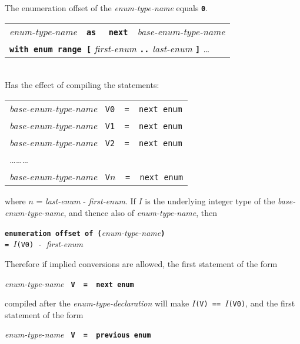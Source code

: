 \documentclass[12pt]{article}
\newcommand{\TT}[1]{{\tt \bfseries #1}}
\newcommand{\STAR}{{\Large $^\star$}}
\newenvironment{indpar}[1][0.3in]%
	{\begin{list}{}%
		     {\setlength{\itemsep}{0in}%
		      \setlength{\topsep}{0in}%
		      \setlength{\parsep}{1ex}%
		      \setlength{\labelwidth}{#1}%
		      \setlength{\leftmargin}{#1}%
		      \addtolength{\leftmargin}{\labelsep}}%
	 \item}%
	{\end{list}}
\newenvironment{itemlist}[1][0.5in]%
	{\begin{list}{}{\setlength{\labelwidth}{#1}%
	                \setlength{\leftmargin}{#1}%
		        \addtolength{\leftmargin}{\labelsep}}}%
	{\end{list}}
\begin{document}
\begin{indpar}
\begin{itemlist}
\item[\TT{define type} {\em qualifier-name}\STAR{} {\em enum-type-name}~~%
    \TT{as}~~{\em builtin-integer-type-name} \ldots{}] ~\\
The enumeration offset of the {\em enum-type-name} equals \TT{0}.
\item[\TT{define type} {\em qualifier-name}\STAR{}]
              \begin{tabular}[t]{@{}l@{}}
              {\em enum-type-name}~~\TT{as}~~%
              \TT{next}~~{\em base-enum-type-name} \\
	      \TT{with enum range [}
	         {\em first-enum} \TT{..} {\em last-enum} \TT{]} \ldots{} \\
	      \end{tabular} \\
Has the effect of compiling the statements:
\begin{center}
\begin{tabular}{l}
{\em base-enum-type-name} {\tt ~V0~~=~~next enum} \\
{\em base-enum-type-name} {\tt ~V1~~=~~next enum} \\
{\em base-enum-type-name} {\tt ~V2~~=~~next enum} \\
\ldots\ldots\ldots \\
{\em base-enum-type-name} {\tt ~V$n$~~=~~next enum} \\
\end{tabular}
\end{center}
where $n$ = {\em last-enum} - {\em first-enum}.
If $I$ is the underlying integer type of the {\em base-enum-type-name},
and thence also of {\em enum-type-name}, then
\begin{center}
\TT{enumeration offset of (}{\em enum-type-name}\TT{)} \\
{\tt =~$I$(V0)~-~}{\em first-enum}
\end{center}
Therefore if implied conversions are allowed, the first statement of the form
\begin{center}
{\em enum-type-name} \TT{~V~~=~~next enum} \\
\end{center}
compiled after the {\em enum-type-declaration} will make
{\tt $I$(V) == $I$(V0)}, and the first statement of the form
\begin{center}
{\em enum-type-name} \TT{~V~~=~~previous enum} \\
\end{center}

\end{itemlist}
\end{indpar}
\end{document}
